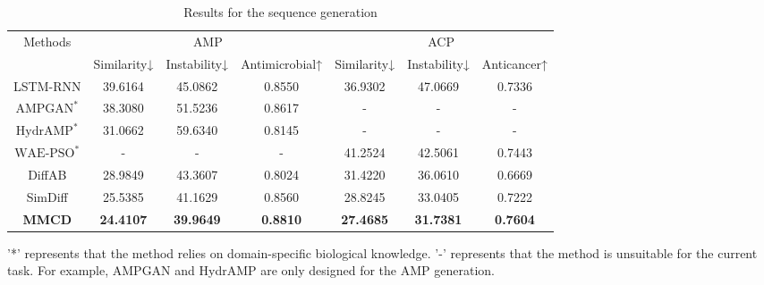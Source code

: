 \documentclass[letterpaper]{article} %
\begin{document}
\begin{table}[ht]
\centering
\begin{threeparttable}[b]
\setlength{\tabcolsep}{10pt}
\begin{tabular}{ccccccc}
\hline
\multirow{2}{*}{Methods} & \multicolumn{3}{c}{AMP}                               & \multicolumn{3}{c}{ACP}                  \\ \cmidrule(r){2-4} \cmidrule(r){5-7}
                         & Similarity↓      & Instability↓     & Antimicrobial↑  & Similarity↓ & Instability↓ & Anticancer↑ \\ \hline
LSTM-RNN                 & 39.6164          & 45.0862          & 0.8550          & 36.9302     & 47.0669      & 0.7336      \\
$\text{AMPGAN}^*$        & 38.3080          & 51.5236          & 0.8617          & -           & -            & -           \\
$\text{HydrAMP}^*$       & 31.0662          & 59.6340          & 0.8145          & -           & -            & -           \\
$\text{WAE-PSO}^*$       & -                & -                & -               & 41.2524     & 42.5061      & 0.7443      \\
DiffAB                   & 28.9849          & 43.3607          & 0.8024          & 31.4220     & 36.0610      & 0.6669      \\
SimDiff                  & 25.5385          & 41.1629          & 0.8560          & 28.8245     & 33.0405      & 0.7222      \\ 
\textbf{MMCD}            & \textbf{24.4107} & \textbf{39.9649} & \textbf{0.8810} & \textbf{27.4685} & \textbf{31.7381} & \textbf{0.7604}  \\ \hline
\end{tabular}
\begin{tablenotes}
\item '*' represents that the method relies on domain-specific biological knowledge. '-' represents that the method is unsuitable for the current task. For example, AMPGAN and HydrAMP are only designed for the AMP generation.
\end{tablenotes}
\end{threeparttable}
\caption{Results for the sequence generation} 
\end{table}
\end{document}
